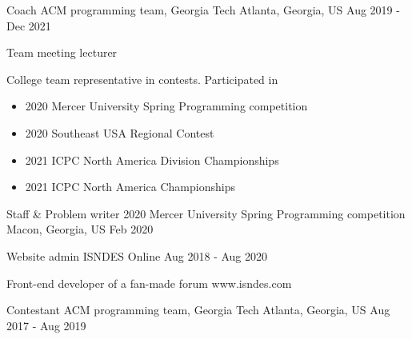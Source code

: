 


\begin{cventries}


\cventry
{Coach} %
{ACM programming team, Georgia Tech} %
{Atlanta, Georgia, US} %
{Aug 2019 - Dec 2021} %
{ %
\begin{cvitems}
\item {Team meeting lecturer}
\item {College team representative in contests. Participated in
	\begin{itemize}
		\item 2020 Mercer University Spring Programming competition
		\item 2020 Southeast USA Regional Contest
		\item 2021 ICPC North America Division Championships
		\item 2021 ICPC North America Championships
	\end{itemize}
}
\end{cvitems}
}


\cventry
{Staff \& Problem writer} %
{2020 Mercer University Spring Programming competition} %
{Macon, Georgia, US} %
{Feb 2020} %
{ %
}


\cventry
{Website admin} %
{ISNDES} %
{Online} %
{Aug 2018 - Aug 2020} %
{ %
	\begin{cvitems}
		\item {Front-end developer of a fan-made forum www.isndes.com}
	\end{cvitems}
}


\cventry
{Contestant} %
{ACM programming team, Georgia Tech} %
{Atlanta, Georgia, US} %
{Aug 2017 - Aug 2019} %
{ %
}




\end{cventries}